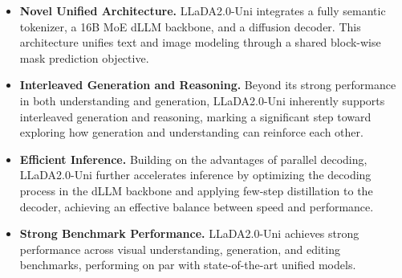 \begin{itemize}[leftmargin=16pt]
    \item \textbf{Novel Unified Architecture.} LLaDA2.0-Uni integrates a fully semantic tokenizer, a 16B MoE dLLM backbone, and a diffusion decoder. This architecture unifies text and image modeling through a shared block-wise mask prediction objective.
    
    \item \textbf{Interleaved Generation and Reasoning.} Beyond its strong performance in both understanding and generation, LLaDA2.0-Uni inherently supports interleaved generation and reasoning, marking a significant step toward exploring how generation and understanding can reinforce each other.
    
    \item \textbf{Efficient Inference.} Building on the advantages of parallel decoding, LLaDA2.0-Uni further accelerates inference by optimizing the decoding process in the dLLM backbone and applying few-step distillation to the decoder, achieving an effective balance between speed and performance.

    \item \textbf{Strong Benchmark Performance.} LLaDA2.0-Uni achieves strong performance across visual understanding, generation, and editing benchmarks, performing on par with state-of-the-art unified models.
\end{itemize}

